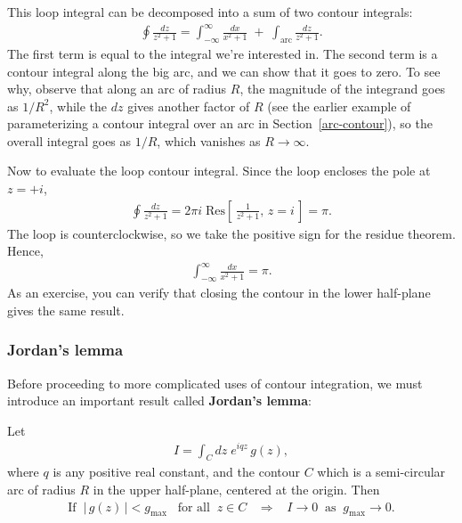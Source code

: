 \documentclass[10pt,a4paper]{article}
\begin{document}
\noindent
This loop integral can be decomposed into a sum of two contour integrals:
\begin{align}
  \oint \frac{dz}{z^2 + 1} = \int_{-\infty}^\infty \frac{dx}{x^2 + 1} \;+\; \int_{\mathrm{arc}} \frac{dz}{z^2 + 1}.
\end{align}
The first term is equal to the integral we're interested in. The
second term is a contour integral along the big arc, and we can show
that it goes to zero.  To see why, observe that along an arc of radius
$R$, the magnitude of the integrand goes as $1/R^{2}$, while the $dz$
gives another factor of $R$ (see the earlier example of parameterizing
a contour integral over an arc in Section~\ref{arc-contour}), so the
overall integral goes as $1/R$, which vanishes as $R \rightarrow
\infty$.

Now to evaluate the loop contour integral. Since the loop encloses the
pole at $z = +i$,
\begin{align}
  \oint \frac{dz}{z^2+1} = 2\pi i \; \mathrm{Res}\left[\,\frac{1}{z^2 + 1}, \, z = i\,\right] = \pi.
\end{align}
The loop is counterclockwise, so we take the positive sign for the
residue theorem. Hence,
\begin{align}
  \int_{-\infty}^\infty \frac{dx}{x^2 + 1} = \pi.
\end{align}
As an exercise, you can verify that closing the contour in the lower
half-plane gives the same result.

\vskip 0.3in

\subsubsection{Jordan's lemma}
\label{jordans-lemma}

Before proceeding to more complicated uses of contour integration, we
must introduce an important result called \textbf{Jordan's lemma}:

\begin{framed}
\noindent
Let
\begin{align}
  I = \int_C dz \; e^{iqz} \,g(z),
\end{align}
where $q$ is any positive real constant, and the contour $C$ which is a semi-circular arc of radius $R$ in the upper half-plane, centered at the origin. Then
\begin{align}
  \text{If}\;\; \big|\,g(z)\,\big| < g_{\mathrm{max}} \;\;\;\text{for all}\;\;z \in C \;\;\;\Rightarrow \;\;\; I \rightarrow 0 \;\;\mathrm{as}\;\; g_{\mathrm{max}} \rightarrow 0.
\end{align}
\end{framed}
\end{document}
